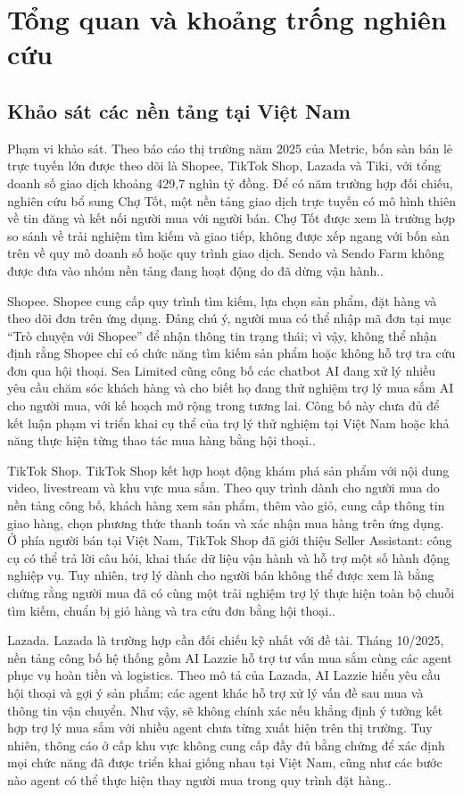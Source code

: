 \documentclass[12pt,a4paper,oneside]{report}
\begin{document}
\chapter{Tổng quan và khoảng trống nghiên cứu}
\section{Khảo sát các nền tảng tại Việt Nam}
Phạm vi khảo sát. Theo báo cáo thị trường năm 2025 của Metric, bốn sàn bán lẻ trực tuyến lớn được theo dõi là Shopee, TikTok Shop, Lazada và Tiki, với tổng doanh số giao dịch khoảng 429,7 nghìn tỷ đồng. Để có năm trường hợp đối chiếu, nghiên cứu bổ sung Chợ Tốt, một nền tảng giao dịch trực tuyến có mô hình thiên về tin đăng và kết nối người mua với người bán. Chợ Tốt được xem là trường hợp so sánh về trải nghiệm tìm kiếm và giao tiếp, không được xếp ngang với bốn sàn trên về quy mô doanh số hoặc quy trình giao dịch. Sendo và Sendo Farm không được đưa vào nhóm nền tảng đang hoạt động do đã dừng vận hành.. \cite{metric2025,vneconomy2026}

Shopee. Shopee cung cấp quy trình tìm kiếm, lựa chọn sản phẩm, đặt hàng và theo dõi đơn trên ứng dụng. Đáng chú ý, người mua có thể nhập mã đơn tại mục “Trò chuyện với Shopee” để nhận thông tin trạng thái; vì vậy, không thể nhận định rằng Shopee chỉ có chức năng tìm kiếm sản phẩm hoặc không hỗ trợ tra cứu đơn qua hội thoại. Sea Limited cũng công bố các chatbot AI đang xử lý nhiều yêu cầu chăm sóc khách hàng và cho biết họ đang thử nghiệm trợ lý mua sắm AI cho người mua, với kế hoạch mở rộng trong tương lai. Công bố này chưa đủ để kết luận phạm vi triển khai cụ thể của trợ lý thử nghiệm tại Việt Nam hoặc khả năng thực hiện từng thao tác mua hàng bằng hội thoại.. \cite{shopeeorder,sea2026}

TikTok Shop. TikTok Shop kết hợp hoạt động khám phá sản phẩm với nội dung video, livestream và khu vực mua sắm. Theo quy trình dành cho người mua do nền tảng công bố, khách hàng xem sản phẩm, thêm vào giỏ, cung cấp thông tin giao hàng, chọn phương thức thanh toán và xác nhận mua hàng trên ứng dụng. Ở phía người bán tại Việt Nam, TikTok Shop đã giới thiệu Seller Assistant: công cụ có thể trả lời câu hỏi, khai thác dữ liệu vận hành và hỗ trợ một số hành động nghiệp vụ. Tuy nhiên, trợ lý dành cho người bán không thể được xem là bằng chứng rằng người mua đã có cùng một trải nghiệm trợ lý thực hiện toàn bộ chuỗi tìm kiếm, chuẩn bị giỏ hàng và tra cứu đơn bằng hội thoại.. \cite{tiktokseller,tiktokshop}

Lazada. Lazada là trường hợp cần đối chiếu kỹ nhất với đề tài. Tháng 10/2025, nền tảng công bố hệ thống gồm AI Lazzie hỗ trợ tư vấn mua sắm cùng các agent phục vụ hoàn tiền và logistics. Theo mô tả của Lazada, AI Lazzie hiểu yêu cầu hội thoại và gợi ý sản phẩm; các agent khác hỗ trợ xử lý vấn đề sau mua và thông tin vận chuyển. Như vậy, sẽ không chính xác nếu khẳng định ý tưởng kết hợp trợ lý mua sắm với nhiều agent chưa từng xuất hiện trên thị trường. Tuy nhiên, thông cáo ở cấp khu vực không cung cấp đầy đủ bằng chứng để xác định mọi chức năng đã được triển khai giống nhau tại Việt Nam, cũng như các bước nào agent có thể thực hiện thay người mua trong quy trình đặt hàng.. \cite{lazada2025}
\end{document}
